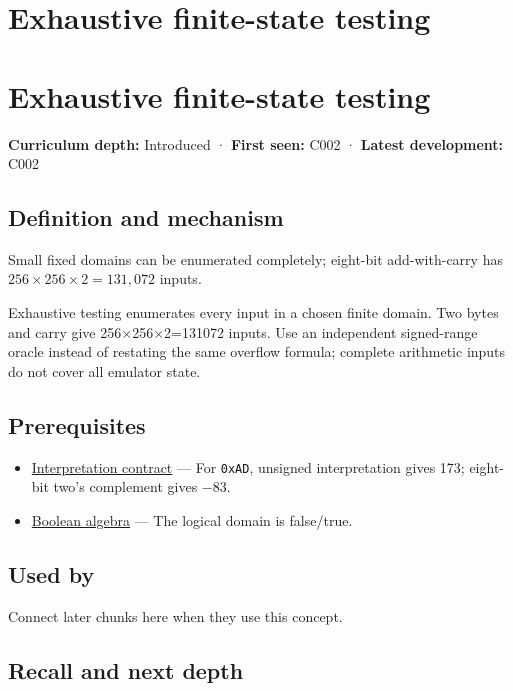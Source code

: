 \hypertarget{appendix-05db24ccc28a}{}
\section*{Exhaustive finite-state testing}
\section{Exhaustive finite-state testing}\label{appendix-05db24ccc28a-exhaustive-finite-state-testing}

\textbf{Curriculum depth:} Introduced · \textbf{First seen:} C002 · \textbf{Latest development:} C002

\subsection{Definition and mechanism}\label{appendix-05db24ccc28a-definition-and-mechanism}

Small fixed domains can be enumerated completely; eight-bit add-with-carry has \(256\times256\times2=131{,}072\) inputs.

Exhaustive testing enumerates every input in a chosen finite domain. Two bytes and carry give 256×256×2=131072 inputs. Use an independent signed-range oracle instead of restating the same overflow formula; complete arithmetic inputs do not cover all emulator state.

\subsection{Prerequisites}\label{appendix-05db24ccc28a-prerequisites}

\begin{itemize}
\tightlist
\item
  \hyperref[appendix-f414bd4ed05c]{Interpretation contract} --- For \texttt{0xAD}, unsigned interpretation gives 173; eight-bit two's complement gives −83.
\item
  \hyperref[appendix-24475e1596a8]{Boolean algebra} --- The logical domain is false/true.
\end{itemize}

\subsection{Used by}\label{appendix-05db24ccc28a-used-by}

Connect later chunks here when they use this concept.

\subsection{Recall and next depth}\label{appendix-05db24ccc28a-recall-and-next-depth}

